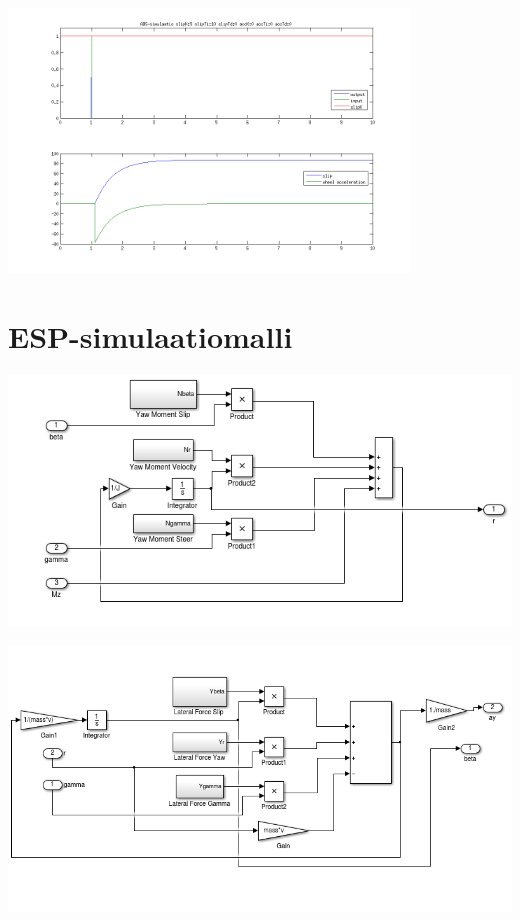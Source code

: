 \documentclass{article}
\newcommand{\kuvaa}[4]{%
	\begin{figure}[h]%
		\centering \texttt{[image: \#2]}%
		\caption{#3 \label{fig:#4}}%
	\end{figure}%
}
\begin{document}
\begin{appendices}
\centering \includegraphics[width=0.8\textwidth]{abssim3}

\section{ESP-simulaatiomalli} \label{app:espmodel}
\centering \includegraphics[width=1.0\textwidth]{espmdl1}

\centering \includegraphics[width=1.0\textwidth]{espmdl2}
\end{appendices}
\end{document}
